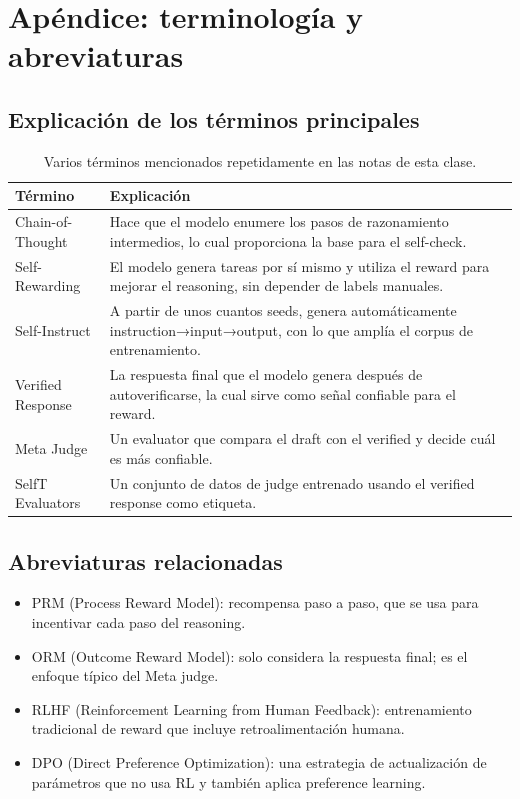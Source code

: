 \documentclass[a4paper]{article}
\begin{document}
\section{Apéndice: terminología y abreviaturas}
\subsection{Explicación de los términos principales}
\begin{table}[H]
\centering
\begin{tabular}{p{4cm}p{11cm}}
\toprule
Término & Explicación \\
\midrule
Chain-of-Thought & Hace que el modelo enumere los pasos de razonamiento intermedios, lo cual proporciona la base para el self-check. \\
Self-Rewarding & El modelo genera tareas por sí mismo y utiliza el reward para mejorar el reasoning, sin depender de labels manuales. \\
Self-Instruct & A partir de unos cuantos seeds, genera automáticamente instruction→input→output, con lo que amplía el corpus de entrenamiento. \\
Verified Response & La respuesta final que el modelo genera después de autoverificarse, la cual sirve como señal confiable para el reward. \\
Meta Judge & Un evaluator que compara el draft con el verified y decide cuál es más confiable. \\
SelfT Evaluators & Un conjunto de datos de judge entrenado usando el verified response como etiqueta. \\
\bottomrule
\end{tabular}
\caption{Varios términos mencionados repetidamente en las notas de esta clase.}
\end{table}

\subsection{Abreviaturas relacionadas}
\begin{itemize}
    \item PRM (Process Reward Model): recompensa paso a paso, que se usa para incentivar cada paso del reasoning.
    \item ORM (Outcome Reward Model): solo considera la respuesta final; es el enfoque típico del Meta judge.
    \item RLHF (Reinforcement Learning from Human Feedback): entrenamiento tradicional de reward que incluye retroalimentación humana.
    \item DPO (Direct Preference Optimization): una estrategia de actualización de parámetros que no usa RL y también aplica preference learning.
\end{itemize}
\end{document}
